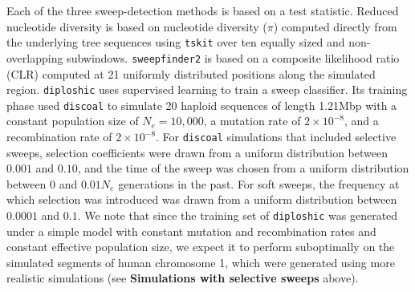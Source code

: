 \documentclass[hidelinks]{article}
\newcommand{\tskit}{\texttt{tskit}\xspace}
\newcommand{\sweepfinder}{\texttt{sweepfinder2}\xspace}
\newcommand{\diploshic}{\texttt{diploshic}\xspace}
\begin{document}
    Each of the three sweep-detection methods is based on a test statistic.
    Reduced nucleotide diversity is based on nucleotide diversity  ($\pi$)
    computed directly from the underlying tree sequences using \tskit \citep{ralph2020efficiently}
    over ten equally sized and non-overlapping subwindows.
    \sweepfinder \citep{degiorgio2016sweepfinder2} is based on a composite likelihood ratio (CLR)
    computed at 21 uniformly distributed positions along the simulated region.
    \diploshic \citep{kern2018diplos} uses supervised learning to train a sweep classifier.
    Its training phase used \texttt{discoal} \citep{kern2016discoal} to simulate 20 haploid sequences of length 1.21Mbp
    with a constant population size of $N_e=10,000$, a mutation rate of $2\times 10^{-8}$, and a recombination rate of $2\times 10^{-8}$.
    For \texttt{discoal} simulations that included selective sweeps,
    selection coefficients were drawn from a uniform distribution between $0.001$ and $0.10$,
    and the time of the sweep was chosen from a uniform distribution between $0$ and $0.01N_e$ generations in the past.
    For soft sweeps, the frequency at which selection was introduced was drawn from a uniform distribution between $0.0001$ and $0.1$.
    We note that since the training set of \diploshic was generated under a simple model with
    constant mutation and recombination rates and constant effective population size,
    we expect it to perform suboptimally on the simulated segments of human chromosome 1,
    which were generated using more realistic simulations (see \textbf{Simulations with selective sweeps} above).
\end{document}
